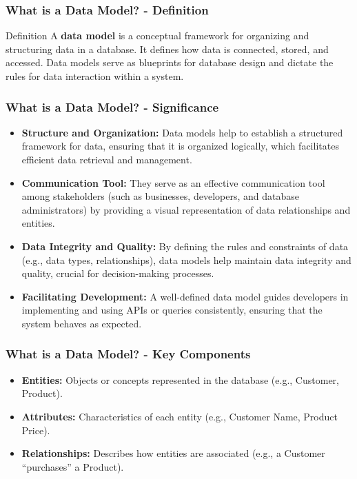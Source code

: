\documentclass[aspectratio=169]{beamer}
\begin{document}
\begin{frame}[fragile]
    \frametitle{What is a Data Model? - Definition}
    \begin{block}{Definition}
        A \textbf{data model} is a conceptual framework for organizing and structuring data in a database. 
        It defines how data is connected, stored, and accessed. 
        Data models serve as blueprints for database design and dictate the rules for data interaction within a system.
    \end{block}
\end{frame}

\begin{frame}[fragile]
    \frametitle{What is a Data Model? - Significance}
    \begin{itemize}
        \item \textbf{Structure and Organization:} 
        Data models help to establish a structured framework for data, ensuring that it is organized logically, which facilitates efficient data retrieval and management.
        
        \item \textbf{Communication Tool:} 
        They serve as an effective communication tool among stakeholders (such as businesses, developers, and database administrators) by providing a visual representation of data relationships and entities.
        
        \item \textbf{Data Integrity and Quality:} 
        By defining the rules and constraints of data (e.g., data types, relationships), data models help maintain data integrity and quality, crucial for decision-making processes.
        
        \item \textbf{Facilitating Development:} 
        A well-defined data model guides developers in implementing and using APIs or queries consistently, ensuring that the system behaves as expected.
    \end{itemize}
\end{frame}

\begin{frame}[fragile]
    \frametitle{What is a Data Model? - Key Components}
    \begin{itemize}
        \item \textbf{Entities:} Objects or concepts represented in the database (e.g., Customer, Product).
        
        \item \textbf{Attributes:} Characteristics of each entity (e.g., Customer Name, Product Price).
        
        \item \textbf{Relationships:} Describes how entities are associated (e.g., a Customer “purchases” a Product).
    \end{itemize}
\end{frame}
\end{document}
